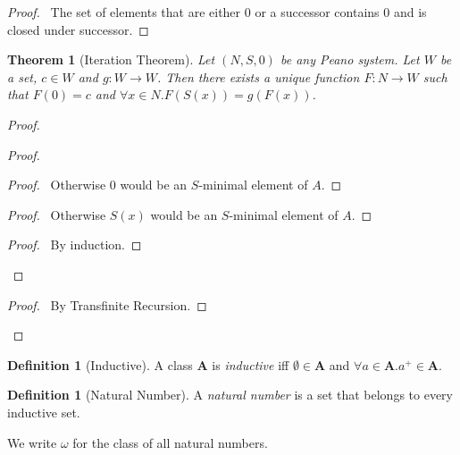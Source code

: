 \documentclass{report}
\let\qed\relax
\newtheorem{theorem}[axiom]{Theorem}
\theoremstyle{definition}
\newtheorem{definition}[axiom]{Definition}
\begin{document}
    \begin{proof}
        \pf\ The set of elements that are either 0 or a successor contains 0 and is closed under successor. \qed
    \end{proof}

    \begin{theorem}[Iteration Theorem]
        Let $(N,S,0)$ be any Peano system. Let $W$ be a set, $c \in W$ and $g : W \rightarrow W$. Then there
        exists a unique function $F : N \rightarrow W$ such that $F(0) = c$ and $\forall x \in N. F(S(x)) = g(F(x))$.
    \end{theorem}

    \begin{proof}
        \pf
        \begin{proof}
            \begin{proof}
                \pf\ Otherwise 0 would be an $S$-minimal element of $A$.
            \end{proof}
            \begin{proof}
                \pf\ Otherwise $S(x)$ would be an $S$-minimal element of $A$.
            \end{proof}
            \begin{proof}
                \pf\ By induction.
            \end{proof}
        \end{proof}
        \qedstep
        \begin{proof}
            \pf\ By Transfinite Recursion.
        \end{proof}
        \qed
    \end{proof}

    \begin{definition}[Inductive]
        A class $\mathbf{A}$ is \emph{inductive} iff $\emptyset \in \mathbf{A}$ and
        $\forall a \in \mathbf{A}. a^+ \in \mathbf{A}$.
    \end{definition}

    \begin{definition}[Natural Number]
        A \emph{natural number} is a set that belongs to every inductive set.

        We write $\omega$ for the class of all natural numbers.
    \end{definition}
\end{document}
